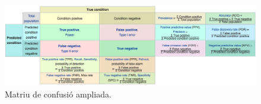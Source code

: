 \documentclass{article} %
\begin{document}
{	\begin{figure}[H]
		\begin{changemargin}{-4.5cm}{0.5cm}
			\includegraphics[width=21cm]{confusionmatrix}
			\centering
			\color{blue}
			\caption{Matriu de confusió ampliada.}\label{visina8}
		\end{changemargin}
	\end{figure}


}
\end{document}
